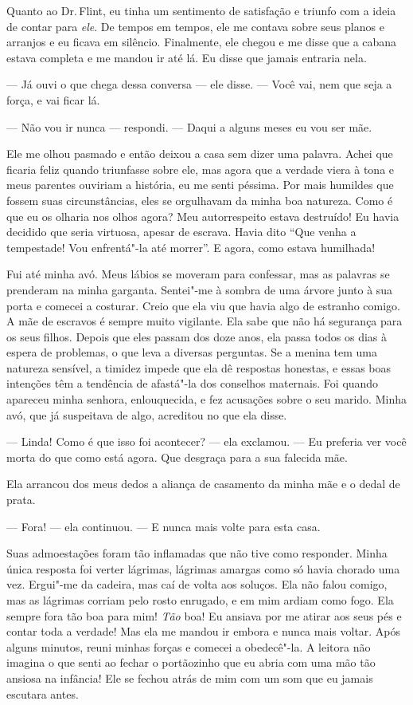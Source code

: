 Quanto ao Dr.\,Flint, eu tinha um
sentimento de satisfação e triunfo com a ideia de contar para
\emph{ele}. De tempos em tempos, ele me contava sobre seus planos e
arranjos e eu ficava em silêncio. Finalmente, ele chegou e me disse que
a cabana estava completa e me mandou ir até lá. Eu disse que jamais
entraria nela.

--- Já ouvi o que chega dessa conversa --- ele disse. --- Você vai, nem
que seja a força, e vai ficar lá.

--- Não vou ir nunca --- respondi. ---
Daqui a alguns meses eu vou ser mãe.

Ele me olhou pasmado e então deixou a
casa sem dizer uma palavra. Achei que ficaria feliz quando triunfasse
sobre ele, mas agora que a verdade viera à tona e meus parentes ouviriam
a história, eu me senti péssima. Por mais humildes que fossem suas
circunstâncias, eles se orgulhavam da minha boa natureza. Como é que eu
os olharia nos olhos agora? Meu autorrespeito estava destruído! Eu havia
decidido que seria virtuosa, apesar de escrava. Havia dito ``Que venha a
tempestade! Vou enfrentá"-la até morrer''. E agora, como estava
humilhada!

Fui até minha avó. Meus lábios se
moveram para confessar, mas as palavras se prenderam na minha garganta.
Sentei"-me à sombra de uma árvore junto à sua porta e comecei a costurar.
Creio que ela viu que havia algo de estranho comigo. A mãe de escravos é
sempre muito vigilante. Ela sabe que não há segurança para os seus
filhos. Depois que eles passam dos doze anos, ela passa todos os dias à
espera de problemas, o que leva a diversas perguntas. Se a menina tem
uma natureza sensível, a timidez impede que ela dê respostas honestas, e
essas boas intenções têm a tendência de afastá"-la dos conselhos
maternais. Foi quando apareceu minha senhora, enlouquecida, e fez
acusações sobre o seu marido. Minha avó, que já suspeitava de algo,
acreditou no que ela disse.

--- Linda! Como é que isso foi acontecer? --- ela exclamou. --- Eu
preferia ver você morta do que como está agora. Que desgraça para a sua
falecida mãe.

Ela arrancou dos meus dedos a aliança de casamento da minha mãe e o
dedal de prata.

--- Fora! --- ela continuou. --- E nunca mais volte para esta casa.

Suas admoestações foram tão inflamadas que não tive como responder.
Minha única resposta foi verter lágrimas, lágrimas amargas como só havia
chorado uma vez. Ergui"-me da cadeira, mas caí de volta aos soluços. Ela
não falou comigo, mas as lágrimas corriam pelo rosto enrugado, e em mim
ardiam como fogo. Ela sempre fora tão boa para mim! \emph{Tão} boa! Eu
ansiava por me atirar aos seus pés e contar toda a verdade! Mas ela me
mandou ir embora e nunca mais voltar. Após alguns minutos, reuni minhas
forças e comecei a obedecê"-la. A leitora não imagina o que senti ao
fechar o portãozinho que eu abria com uma mão tão ansiosa na infância!
Ele se fechou atrás de mim com um som que eu jamais escutara antes.

